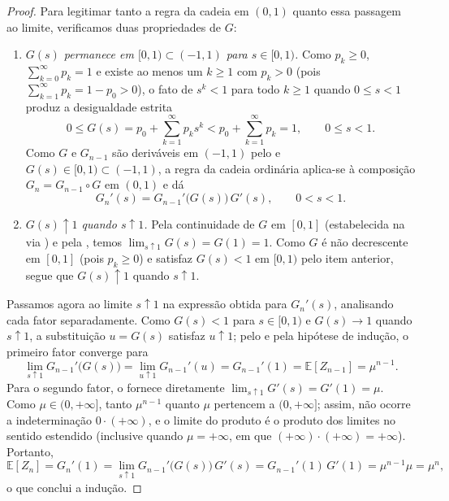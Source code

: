 \documentclass[12pt,portuguese]{article}
\theoremstyle{definition}
\theoremstyle{plainexercise}
\theoremstyle{starredexercise}
\theoremstyle{definition}
\begin{document}
\begin{proof}
Para legitimar tanto a regra da cadeia em $(0,1)$ quanto essa passagem ao
limite, verificamos duas propriedades de $G$:
\begin{enumerate}[label=(\roman*)]
  \item \emph{$G(s)$ permanece em $[0,1)\subset(-1,1)$ para $s\in[0,1)$.}
        Como $p_k\geqslant 0$, $\sum_{k=0}^{\infty}p_k=1$ e existe ao
        menos um $k\geqslant 1$ com $p_k>0$ (pois
        $\sum_{k=1}^{\infty}p_k=1-p_0>0$), o fato de $s^k<1$ para todo
        $k\geqslant 1$ quando $0\leqslant s<1$ produz a desigualdade
        estrita
        \[
        0\leqslant G(s)=p_0+\sum_{k=1}^{\infty}p_k s^k
        <p_0+\sum_{k=1}^{\infty}p_k=1,
        \qquad 0\leqslant s<1.
        \]
        Como $G$ e $G_{n-1}$ são deriváveis em $(-1,1)$ pelo
         e $G(s)\in[0,1)\subset(-1,1)$, a regra
        da cadeia ordinária aplica-se à composição $G_n=G_{n-1}\circ G$
        em $(0,1)$ e dá
        \[
        G_n'(s)=G_{n-1}'\bigl(G(s)\bigr)\,G'(s),
        \qquad 0<s<1.
        \]
  \item \emph{$G(s)\uparrow 1$ quando $s\uparrow 1$.} Pela continuidade
        de $G$ em $[0,1]$ (estabelecida na 
        via ) e pela , temos
        $\lim_{s\uparrow 1}G(s)=G(1)=1$. Como $G$ é não decrescente em
        $[0,1]$ (pois $p_k\geqslant 0$) e satisfaz $G(s)<1$ em $[0,1)$
        pelo item anterior, segue que $G(s)\uparrow 1$ quando
        $s\uparrow 1$.
\end{enumerate}

Passamos agora ao limite $s\uparrow 1$ na expressão obtida para $G_n'(s)$,
analisando cada fator separadamente. Como $G(s)<1$ para $s\in[0,1)$ e
$G(s)\to 1$ quando $s\uparrow 1$, a substituição $u=G(s)$ satisfaz
$u\uparrow 1$; pelo  e pela hipótese de indução,
o primeiro fator converge para
\[
\lim_{s\uparrow 1}G_{n-1}'\bigl(G(s)\bigr)
=\lim_{u\uparrow 1}G_{n-1}'(u)
=G_{n-1}'(1)
=\mathbb{E}[Z_{n-1}]
=\mu^{n-1}.
\]
Para o segundo fator, o  fornece diretamente
$\lim_{s\uparrow 1}G'(s)=G'(1)=\mu$. Como $\mu\in(0,+\infty]$, tanto $\mu^{n-1}$
quanto $\mu$ pertencem a $(0,+\infty]$; assim, não ocorre a
indeterminação $0\cdot(+\infty)$, e o limite do produto é o produto dos
limites no sentido estendido (inclusive quando $\mu=+\infty$, em que
$(+\infty)\cdot(+\infty)=+\infty$). Portanto,
\[
\mathbb{E}[Z_n]
=G_n'(1)
=\lim_{s\uparrow 1}G_{n-1}'\bigl(G(s)\bigr)\,G'(s)
=G_{n-1}'(1)\,G'(1)
=\mu^{n-1}\mu
=\mu^n,
\]
o que conclui a indução.
\end{proof}
\end{document}
